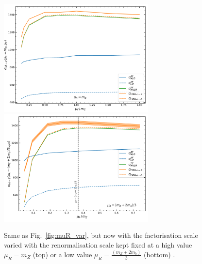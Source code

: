 \documentclass[12pt]{article}
\begin{document}
\begin{figure}
  \begin{center}
    \includegraphics[width=0.7\textwidth]{muF_mh_var.pdf}
    \includegraphics[width=0.7\textwidth]{muF_var.pdf} 
    \caption{\label{fig:muF_var} Same as Fig.~\ref{fig:muR_var}, but now
      with the factorisation scale varied with the renormalisation scale
      kept fixed at a high value 
      $\mu_R=m_Z$  (top) or a low value  $\mu_R=\frac{(m_Z+2m_b)}{3}$ (bottom) .}
  \end{center}
\end{figure}
\end{document}
